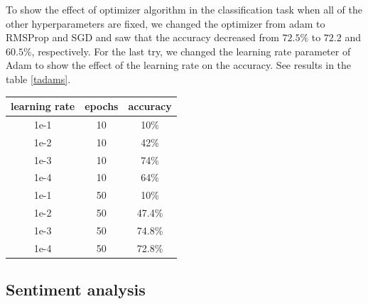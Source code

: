 \documentclass[10pt]{SelfArx} %
\begin{document}
	To show the effect of optimizer algorithm in the classification task when all of the other hyperparameters are fixed, we changed the optimizer from adam to RMSProp and SGD and saw that the accuracy decreased from $72.5\%$ to $72.2$ and $60.5\%$, respectively. 
	For the last try, we changed the learning rate parameter of Adam to show the effect of the learning rate on the accuracy.  See results in the table \ref{tadams}.
	\begin{center}
		\begin{tabular*}{.85\linewidth}{@{\extracolsep{\fill} }ccc@{}}
			\toprule
			learning rate & epochs &accuracy \\ \midrule
			1e-1&10 & 10\% \\
			1e-2&10 & 42\% \\
			1e-3 &10& 74\% \\
			1e-4 &10& 64\% \\ 
			
			1e-1 &50 & 10\% \\
			1e-2 &50 & 47.4\% \\
			1e-3 &50& 74.8\% \\
			1e-4 &50& 72.8\% \\ 
			\bottomrule
		\end{tabular*}
		\label{tadams}
	\end{center}
	
	\subsection{Sentiment analysis}
	
\end{document}
